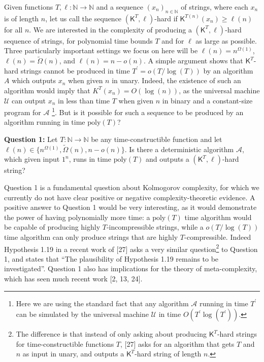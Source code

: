 \documentclass[10pt,a4paper]{article}
\begin{document}
Given functions $T,\ell:\mathbb{N}\rightarrow\mathbb{N}$ and a sequence $(x_{n})_{n\in\mathbb{N}}$ of strings, where each $x_{n}$ is of length $n$, let us call the sequence $({\mathsf{K}}^{T},\ell)$-hard if ${\mathsf{K}}^{T(n)}(x_{n})\geq\ell(n)$ for all $n$. We are interested in the complexity of producing a $({\mathsf{K}}^{T},\ell)$-hard sequence of strings, for polynomial time bounds $T$ and for $\ell$ as large as possible. Three particularly important settings we focus on here will be $\ell(n)=n^{\Omega(1)}$, $\ell(n)=\tilde{\Omega}(n)$, and $\ell(n)=n-o(n)$. A simple argument shows that ${\mathsf{K}}^{T}$-hard strings cannot be produced in time $T^{\prime}=o(T/\log(T))$ by an algorithm $A$ which outputs $x_{n}$ when given $n$ in unary. Indeed, the existence of such an algorithm would imply that $K^{T}(x_{n})=O(\log(n))$, as the universal machine $\mathcal{U}$ can output $x_{n}$ in less than time $T$ when given $n$ in binary and a constant-size program for $\mathcal{A}$ \footnote{Here we are using the standard fact that any algorithm $\mathcal{A}$ running in time $T^{\prime}$ can be simulated by the universal machine $\mathcal{U}$ in time $O(T^{\prime}\log(T^{\prime}))$.}. But is it possible for such a sequence to be produced by an algorithm running in time $\mathrm{poly}(T)$? 

\textbf{Question 1:} Let $T:\mathbb{N}\rightarrow\mathbb{N}$ be any time-constructible function and let $\ell(n)\in\{n^{\Omega(1)},\tilde{\Omega}(n),n-o(n)\}$. Is there a deterministic algorithm $\mathcal{A}$, which given input $1^{n}$, runs in time $\mathrm{poly}(T)$ and outputs a $({\mathsf{K}}^{T},\ell)$-hard string? 

Question 1 is a fundamental question about Kolmogorov complexity, for which we currently do not have clear positive or negative complexity-theoretic evidence. A positive answer to Question 1 would be very interesting, as it would demonstrate the power of having polynomially more time: a $\mathrm{poly}(T)$ time algorithm would be capable of producing highly $T$-incompressible strings, while a $o(T/\log(T))$ time algorithm can only produce strings that are highly $T$-compressible. Indeed Hypothesis 1.19 in a recent work of [27] asks a very similar question\footnote{The difference is that instead of only asking about producing ${\mathsf{K}}^{T}$-hard strings for time-constructible functions $T$, [27] asks for an algorithm that gets $T$ and $n$ as input in unary, and outputs a ${\mathsf{K}}^{T}$-hard string of length $n$.} to Question 1, and states that “The plausibility of Hypothesis 1.19 remains to be investigated”. Question 1 also has implications for the theory of meta-complexity, which has seen much recent work [2, 13, 24].\par
\end{document}
